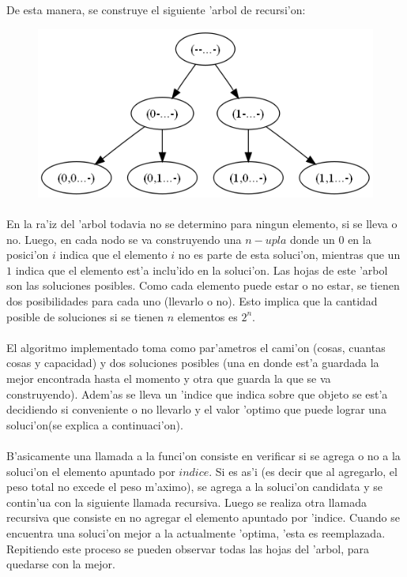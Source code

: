 De esta manera, se construye el siguiente 'arbol de recursi'on:\\
\begin{figure}[H]
\centering
\includegraphics[scale=0.5]{./ejercicio2/arbol.png}
\end{figure}

\paragraph{}
En la ra'iz del 'arbol todavia no se determino para ningun elemento, si se lleva o no. Luego, en cada nodo se va construyendo una $n-upla$ donde un $0$ en la posici'on $i$ 
indica que el elemento $i$ no es parte de esta soluci'on, mientras que  un $1$ indica que el elemento est'a inclu'ido en la soluci'on.
Las hojas de este 'arbol son las soluciones posibles. Como cada elemento puede estar o no estar, se tienen dos posibilidades para cada
uno (llevarlo o no). Esto implica que la cantidad posible de soluciones si se tienen $n$ elementos es $2^n$.
\paragraph{}
El algoritmo implementado toma como par'ametros el cami'on (cosas, cuantas cosas y capacidad)  y dos soluciones posibles (una en donde est'a guardada la mejor 
encontrada hasta el momento y otra que guarda la que se va construyendo). Adem'as se lleva un 'indice que 
indica sobre que objeto se est'a decidiendo si conveniente o no llevarlo y el valor 'optimo que puede lograr una soluci'on(se explica a continuaci'on).
\paragraph{}
B'asicamente una llamada a la funci'on consiste en verificar si se agrega o no a la soluci'on el elemento apuntado por $indice$. Si es as'i (es 
decir que al agregarlo, el peso total no excede el peso m'aximo), se agrega a la soluci'on candidata y se contin'ua con la 
siguiente llamada recursiva. Luego se realiza otra llamada recursiva que consiste en no agregar el elemento apuntado por 'indice. Cuando se encuentra 
una soluci'on mejor a la actualmente 'optima, 'esta es reemplazada. Repitiendo este proceso se pueden observar todas 
las hojas del 'arbol, para quedarse con la mejor.
